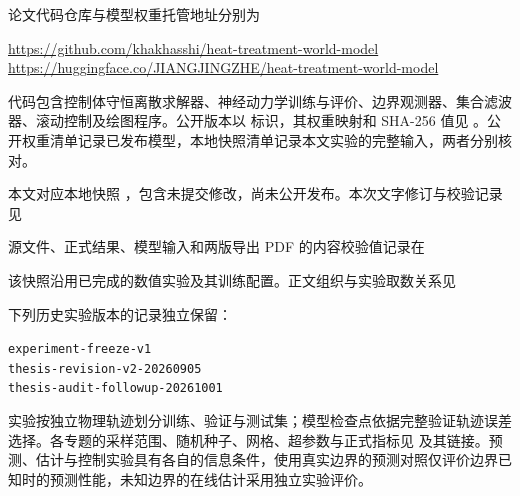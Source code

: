 \appendix


论文代码仓库与模型权重托管地址分别为
\begin{center}
  \url{https://github.com/khakhasshi/heat-treatment-world-model}\\
  \url{https://huggingface.co/JIANGJINGZHE/heat-treatment-world-model}
\end{center}
代码包含控制体守恒离散求解器、神经动力学训练与评价、边界观测器、集合滤波器、滚动控制及绘图程序。公开版本以  标识，其权重映射和 SHA-256 值见 。公开权重清单记录已发布模型，本地快照清单记录本文实验的完整输入，两者分别核对。

本文对应本地快照 ，包含未提交修改，尚未公开发布。本次文字修订与校验记录见
\begin{center}
\end{center}
源文件、正式结果、模型输入和两版导出 PDF 的内容校验值记录在
\begin{center}
\end{center}
该快照沿用已完成的数值实验及其训练配置。正文组织与实验取数关系见
\begin{center}
\end{center}
下列历史实验版本的记录独立保留：
\begin{center}
  \small\texttt{experiment-freeze-v1}\\
  \texttt{thesis-revision-v2-20260905}\\
  \texttt{thesis-audit-followup-20261001}
\end{center}


实验按独立物理轨迹划分训练、验证与测试集；模型检查点依据完整验证轨迹误差选择。各专题的采样范围、随机种子、网格、超参数与正式指标见  及其链接。预测、估计与控制实验具有各自的信息条件，使用真实边界的预测对照仅评价边界已知时的预测性能，未知边界的在线估计采用独立实验评价。

